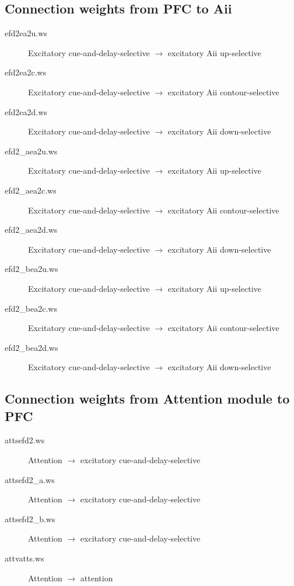\documentclass[12pt]{article}
\begin{document}
\subsection{Connection weights from PFC to Aii}
\begin{description}
  \item[efd2ea2u.ws] Excitatory cue-and-delay-selective $\rightarrow$
                     excitatory Aii up-selective
  \item[efd2ea2c.ws] Excitatory cue-and-delay-selective $\rightarrow$
                     excitatory Aii contour-selective
  \item[efd2ea2d.ws] Excitatory cue-and-delay-selective $\rightarrow$
                     excitatory Aii down-selective
  \item[efd2\_aea2u.ws] Excitatory cue-and-delay-selective $\rightarrow$
                     excitatory Aii up-selective
  \item[efd2\_aea2c.ws] Excitatory cue-and-delay-selective $\rightarrow$
                     excitatory Aii contour-selective
  \item[efd2\_aea2d.ws] Excitatory cue-and-delay-selective $\rightarrow$
                     excitatory Aii down-selective
  \item[efd2\_bea2u.ws] Excitatory cue-and-delay-selective $\rightarrow$
                     excitatory Aii up-selective
  \item[efd2\_bea2c.ws] Excitatory cue-and-delay-selective $\rightarrow$
                     excitatory Aii contour-selective
  \item[efd2\_bea2d.ws] Excitatory cue-and-delay-selective $\rightarrow$
                     excitatory Aii down-selective
\end{description}

\subsection{Connection weights from Attention module to PFC}
\begin{description}
  \item[attsefd2.ws]  Attention $\rightarrow$
                      excitatory cue-and-delay-selective
  \item[attsefd2\_a.ws]  Attention $\rightarrow$
                      excitatory cue-and-delay-selective
  \item[attsefd2\_b.ws]  Attention $\rightarrow$
                      excitatory cue-and-delay-selective
  \item[attvatts.ws]  Attention $\rightarrow$ attention         
\end{description}
\end{document}
